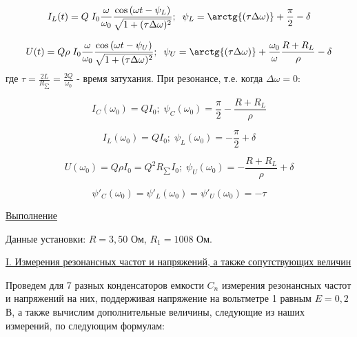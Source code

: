 \documentclass{article}
\begin{document}
\begin{equation}
    I_{L}(t) = Q\;I_{0}\frac{\omega}{\omega_{0}}\frac{\cos{(\omega t - \psi_{L}})}{\sqrt{1 + (\tau \Delta \omega)^{2}}}; \; \;  \psi_{L} = \arctg{(\tau \Delta \omega)} + \frac{\pi}{2} - \delta
\end{equation}


\begin{equation}
    U(t) = Q\rho\;I_{0}\frac{\omega}{\omega_{0}}\frac{\cos{(\omega t - \psi_{U}})}{\sqrt{1 + (\tau \Delta \omega)^{2}}}; \; \;  \psi_{U} = \arctg{(\tau \Delta \omega)} + \frac{\omega_{0}}{\omega}\frac{R + R_{L}}{\rho} - \delta
\end{equation}
где $\tau=\frac{2L}{R_{\sum}}=\frac{2Q}{\omega_0}$ - время затухания.\newline
При резонансе, т.е. когда $\Delta\omega=0$:

$$I_C(\omega_0)=QI_0; \; \psi_C(\omega_0)=\frac{\pi}{2}-\frac{R+R_L}{\rho}$$

$$I_L(\omega_0)=QI_0; \;
\psi_L(\omega_0)=-\frac{\pi}{2}+\delta$$

$$U(\omega_0)=Q\rho I_0=Q^2R_{\sum}I_0; \;
\psi_U(\omega_0)=-\frac{R+R_L}{\rho}+\delta$$

$$\psi'_C(\omega_0)=\psi'_L(\omega_0)=\psi'_U(\omega_0)=-\tau$$

\begin{center}
    \raggedleft
        \underline{\underline{\LARGE {Выполнение}}}
\end{center}

Данные установки: $ R = 3,50  $ Ом, $ R_1 = 1008 $ Ом.

\begin{center}
    \underline{\large {\RN{1}. Измерения резонансных частот и напряжений, а также сопутствующих величин}}
\end{center}

Проведем для 7 разных конденсаторов емкости $ C_n $ измерения резонансных частот и напряжений на них, поддерживая напряжение на вольтметре 1 равным $ E = 0,2 $ В, а также вычислим дополнительные величины, следующие из наших измерений, по следующим формулам:  
\end{document}
